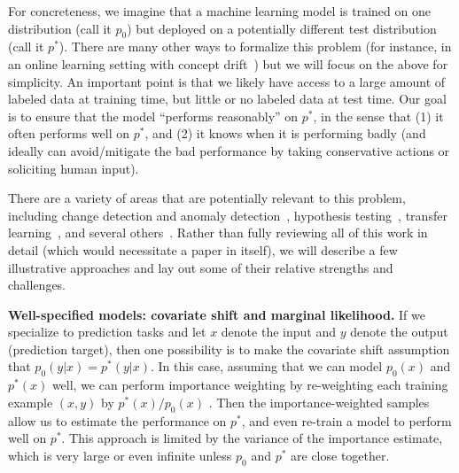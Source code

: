 \documentclass[a4paper,10pt]{article}
\begin{document}
For concreteness, we imagine that a machine learning model is trained on one distribution (call it $p_0$) but deployed on a potentially different test distribution (call it $p^*$). There are many other ways to formalize this problem (for instance, in an online learning setting with concept drift~\cite{herbster2001tracking,gama2004learning}) but we will focus on the above for simplicity. An important point is that we likely have access to a large amount of labeled data at training time, but little or no labeled data at test time. Our goal is to ensure that the model ``performs reasonably'' on $p^*$, in the sense that (1) it often performs well on $p^*$, and (2) it knows when it is performing badly (and ideally can avoid/mitigate the bad performance by taking conservative actions or soliciting human input).

There are a variety of areas that are potentially relevant to this problem, including change detection and anomaly detection~\cite{basseville1988detecting,kawahara2009change,liu2013change}, hypothesis testing~\cite{steinebach2006lehmann}, transfer learning~\cite{shimodaira2000improving,quinonero2009dataset,raina2007self,blitzer2011domain}, and several others~\cite{shafer2008tutorial,li2011knows,balasubramanian2011unsupervised,platanios2014estimating,platanios2015thesis,jaffe2014estimating,steinhardt2016unsupervised}. Rather than fully reviewing all of this work in detail (which would necessitate a paper in itself), we will describe a few illustrative approaches and lay out some of their relative strengths and challenges.

{\bf Well-specified models: covariate shift and marginal likelihood.} If we specialize to prediction tasks and let $x$ denote the input and $y$ denote the output (prediction target), then one possibility is to make the covariate shift assumption that $p_0(y | x) = p^*(y | x)$. In this case, assuming that we can model $p_0(x)$ and $p^*(x)$ well, we can perform importance weighting by re-weighting each training example $(x,y)$ by $p^*(x)/p_0(x)$ \cite{shimodaira2000improving,quinonero2009dataset}. Then the importance-weighted samples allow us to estimate the performance on $p^*$, and even re-train a model to perform well on $p^*$. This approach is limited by the variance of the importance estimate, which is very large or even infinite unless $p_0$ and $p^*$ are close together.
\end{document}
